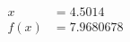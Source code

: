 \documentclass[preview]{standalone}
\begin{document}
\begin{align*}
x &= 4.5014\\f(x) &= 7.9680678
\end{align*}
\end{document}
